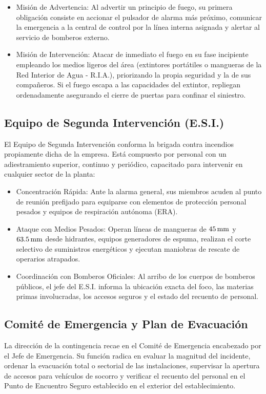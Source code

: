 \begin{itemize}
    \item Misión de Advertencia: Al advertir un principio de fuego, su primera obligación consiste en accionar el
          pulsador de alarma más próximo, comunicar la emergencia a la central de control por la línea interna asignada y
          alertar al servicio de bomberos externo.
    \item Misión de Intervención: Atacar de inmediato el fuego en su fase incipiente empleando los medios ligeros del área
          (extintores portátiles o mangueras de la Red Interior de Agua - R.I.A.), priorizando la propia seguridad y la de
          sus compañeros. Si el fuego escapa a las capacidades del extintor, repliegan ordenadamente asegurando el cierre
          de puertas para confinar el siniestro.
\end{itemize}

\subsection{Equipo de Segunda Intervención (E.S.I.)}

El Equipo de Segunda Intervención conforma la brigada contra incendios propiamente dicha de la empresa. Está compuesto por
personal con un adiestramiento superior, continuo y periódico, capacitado para intervenir en cualquier sector de la
planta:

\begin{itemize}
    \item Concentración Rápida: Ante la alarma general, sus miembros acuden al punto de reunión prefijado para equiparse
          con elementos de protección personal pesados y equipos de respiración autónoma (ERA).
    \item Ataque con Medios Pesados: Operan líneas de mangueras de $45\,\mathrm{mm}$ y $63.5\,\mathrm{mm}$ desde hidrantes, equipos generadores
          de espuma, realizan el corte selectivo de suministros energéticos y ejecutan maniobras de rescate de operarios
          atrapados.
    \item Coordinación con Bomberos Oficiales: Al arribo de los cuerpos de bomberos públicos, el jefe del E.S.I. informa la
          ubicación exacta del foco, las materias primas involucradas, los accesos seguros y el estado del recuento de
          personal.
\end{itemize}

\subsection{Comité de Emergencia y Plan de Evacuación}

La dirección de la contingencia recae en el Comité de Emergencia encabezado por el Jefe de Emergencia. Su función radica
en evaluar la magnitud del incidente, ordenar la evacuación total o sectorial de las instalaciones, supervisar la
apertura de accesos para vehículos de socorro y verificar el recuento del personal en el Punto de Encuentro Seguro
establecido en el exterior del establecimiento.

